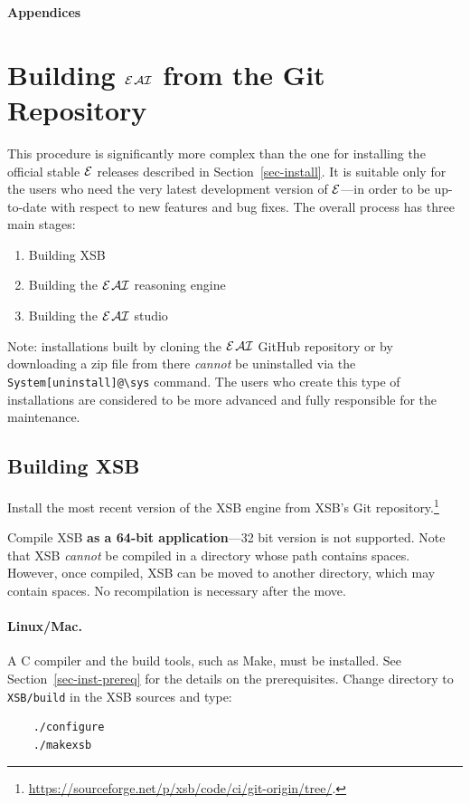 \documentclass[11pt]{article}
\newcommand{\ERGO}{\mbox{\ensuremath{\cal{E}}\smaller{{\sc{RGO}}}}\xspace}
\newcommand{\ERGOAI}{\mbox{{\ensuremath{\cal{E}}\smaller{{\sc{RGO}}}}\ensuremath{\cal{AI}}}\xspace}
\newcommand{\FLSYSTEM}{\ERGO}
\begin{document}
\appendix

\newpage

\noindent
{\LARGE\bf Appendices}

\section{Building \ERGOAI from the Git Repository}
\label{app-building-ergo}

This procedure is significantly more complex than the one for installing
the official stable \FLSYSTEM releases described in Section~\ref{sec-install}. It is suitable only for the
users who need the very latest development version of \FLSYSTEM---in
order to be up-to-date with respect to new features and bug fixes.
The overall process has three main stages:
\begin{enumerate}
\item  Building XSB
\item  Building the \ERGOAI reasoning engine
\item Building the \ERGOAI studio
\end{enumerate}
Note: installations built by cloning the \ERGOAI GitHub repository or by
downloading a zip file from there \emph{cannot} be uninstalled via the
\verb|System[uninstall]@\sys| command. 
The users who create this type of installations are considered to be more
advanced and fully responsible for the maintenance.

\subsection{Building XSB}\label{sec-vc-compile}

Install the most recent version of the XSB engine from
XSB's Git repository.\footnote{
  \url{https://sourceforge.net/p/xsb/code/ci/git-origin/tree/}.
  }


Compile XSB \textbf{as a 64-bit application}---32 bit version is not
supported.
Note that XSB \emph{cannot} be compiled in a directory whose path contains
spaces.  However, once compiled, XSB can be moved to another directory,
which may contain spaces. No recompilation is necessary after the move.

\paragraph{Linux/Mac.}
A C compiler and the build tools, such as Make, must be installed.
See Section~\ref{sec-inst-prereq} for the details on the prerequisites.
Change directory to \texttt{XSB/build} in the XSB sources and type:
\begin{verbatim}
    ./configure
    ./makexsb
\end{verbatim}
\end{document}

